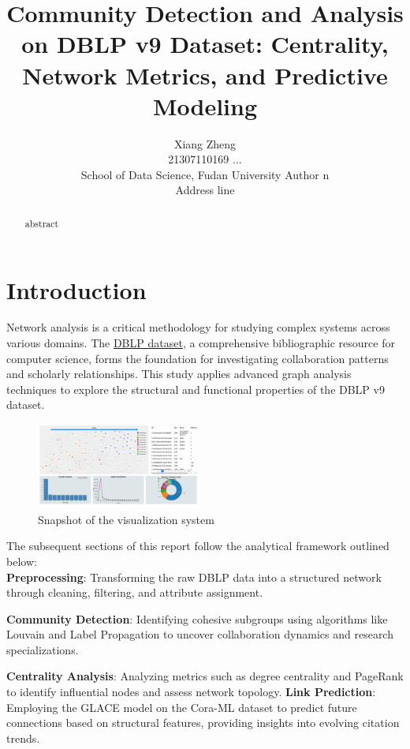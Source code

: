 \documentclass[11pt]{article}
\title{Community Detection and Analysis on DBLP v9 Dataset: Centrality, Network Metrics, and Predictive Modeling}
\author{
  Xiang Zheng \\ 21307110169 \And  
  ... 
  \vspace{0.7cm} \\ %
  \hfill School of Data Science, Fudan University \hfill
  \And
  Author n \\ Address line
}
\begin{document}
\maketitle
\begin{abstract}
	abstract
\end{abstract}

\section{Introduction}

Network analysis is a critical methodology for studying complex systems across various domains. The \href{https://www.aminer.cn/citation}{DBLP dataset}, a comprehensive bibliographic resource for computer science, forms the foundation for investigating collaboration patterns and scholarly relationships. This study applies advanced graph analysis techniques to explore the structural and functional properties of the DBLP v9 dataset.

\begin{figure}[ht]
	\centering
	\includegraphics[width=0.48\textwidth]{img/introduction/visualization.png}
	\caption{Snapshot of the visualization system}
	\label{fig:visualize}
\end{figure}

The subsequent sections of this report follow the analytical framework outlined below:
\\

\textbf{Preprocessing}: Transforming the raw DBLP data into a structured network through cleaning, filtering, and attribute assignment.

\textbf{Community Detection}: Identifying cohesive subgroups using algorithms like Louvain and Label Propagation to uncover collaboration dynamics and research specializations.

\textbf{Centrality Analysis}: Analyzing metrics such as degree centrality and PageRank to identify influential nodes and assess network topology.
\textbf{Link Prediction}: Employing the GLACE model on the Cora-ML dataset to predict future connections based on structural features, providing insights into evolving citation trends.
\end{document}

